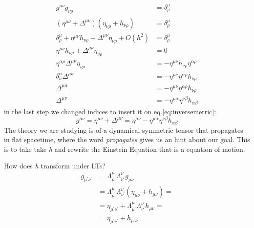 \begin{align}
	g^{\mu \nu }g_{\nu \rho } &= \delta ^{\mu }_{\rho } \nonumber\\
	\left( \eta ^{\mu \nu } +\Delta ^{\mu \nu } \right)\left( \eta _{\nu \rho }+h_{\nu \rho } \right) &= \delta ^{\mu }_{\rho } \nonumber\\
	\delta ^{\mu }_{\rho } + \eta ^{\mu \nu }h_{\nu \rho } + \Delta ^{\mu \nu }\eta _{\nu \rho } + O\left( h^{2} \right) &= \delta ^{\mu }_{\rho } \nonumber\\
	\eta ^{\mu \nu }h_{\nu \rho } + \Delta ^{\mu \nu }\eta _{\nu \rho } & = 0 \nonumber\\
	\eta ^{\alpha \rho }\Delta ^{\mu \nu }\eta _{\nu \rho } & = - \eta ^{\mu \nu }h_{\nu \rho }\eta ^{\alpha \rho } \nonumber\\
	\delta ^{\alpha }_{\nu }\Delta ^{\mu \nu } &= - \eta ^{\mu \nu }\eta ^{\alpha \rho }h_{\nu \rho } \nonumber\\
	\Delta ^{\mu \alpha } &= -\eta ^{\mu \nu }\eta ^{\alpha \rho }h_{\nu \rho } \nonumber\\
	\Delta ^{\mu \nu } &= -\eta ^{\mu \alpha }\eta ^{\nu \beta }h_{\alpha \beta }
\end{align}
in the last step we changed indices to insert it on eq.\ref{eq:inversemetric}:
\begin{equation}
g^{\mu \nu } = \eta ^{\mu \nu } + \Delta^{\mu \nu } = \eta ^{\mu \nu }- \eta ^{\mu \alpha }\eta ^{\nu \beta }h_{\alpha \beta }
\end{equation}
The theory we are studying is of a dynamical symmetric tensor that propagates in flat spacetime, where the word \emph{propagates} gives us an hint about our goal. This is to take take \emph{h} and rewrite the Einstein Equation that is a equation of motion. \par
How does \emph{h} transform under LTs?
\begin{align}
	g_{\mu ^{\prime }\nu ^{\prime }} &= \Lambda ^{\mu }_{\mu ^{\prime }} \Lambda ^{\nu }_{\nu ^{\prime }}g_{\mu \nu } = \nonumber\\
	&= \Lambda ^{\mu }_{\mu ^{\prime }}\Lambda ^{\nu }_{\nu ^{\prime }}\left( \eta _{\mu \nu }+h_{\mu \nu } \right) = \nonumber\\
	&= \eta _{\mu ^{\prime }\nu ^{\prime }} + \Lambda ^{\mu }_{\mu ^{\prime }}\Lambda ^{\nu }_{\nu ^{\prime }}h_{\mu \nu } = \nonumber\\
	&= \eta _{\mu ^{\prime }\nu ^{\prime }}+h_{\mu ^{\prime }\nu ^{\prime }}
\end{align}
